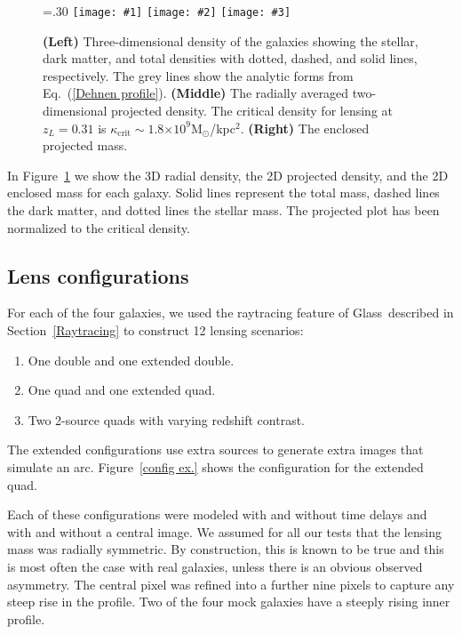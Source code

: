 \documentclass[galley]{mn2e}
\newcommand{\Glass}{{\sc Glass}}
\newcommand{\Msun}{\ensuremath{\mathrm{M}_\odot}}
\newcommand{\figref}[1] {Figure~\ref{#1}}
\newcommand{\eqnref}[1] {Eq.~(\ref{#1})}
\newcommand{\secref}[1] {Section~\ref{#1}}
\newcommand{\e}[1]{\ensuremath{\times 10^{#1}}}
\newcommand\plotone[1]{%
 \centering
 \leavevmode
 \texttt{[image: \#1]}%
}%
\newcommand\plotthree[3]{{%
 \centering
 \leavevmode
 \columnwidth=.30\columnwidth
 \texttt{[image: \#1]}%
 \hfil
 \texttt{[image: \#2]}%
 \hfil
 \texttt{[image: \#3]}%
}}%
\begin{document}
\begin{figure}
\plotthree{MockGalProfile-a.pdf} {MockGalProfile-b.pdf} {MockGalProfile-c.pdf}
\caption{
\textbf{(Left)} 
Three-dimensional density of the galaxies showing the stellar, dark matter,
and total densities with dotted, dashed, and solid lines, respectively. The
grey lines show the analytic forms from \eqnref{Dehnen profile}. 
\textbf{(Middle)} 
The radially averaged two-dimensional projected density.
The critical density for lensing at $z_L=0.31$ is $\kappa_\mathrm{crit}\sim 1.8\e{9}$\Msun/kpc$^2$.
\textbf{(Right)}
The enclosed projected mass.
}
\label{mock galaxies}
\end{figure}

In \figref{mock galaxies} we show the 3D radial density, 
the 2D projected density, and the 2D enclosed mass for each
galaxy. Solid lines represent the total mass, dashed lines the dark 
matter, and dotted lines the stellar mass. The projected plot has
been normalized to the critical density.

\subsection{Lens configurations} %

For each of the four galaxies, we used the raytracing feature of \Glass\
described in \secref{Raytracing} to construct 12 lensing scenarios:

\begin{enumerate}
\item One double and one extended double.
\item One quad and one extended quad.
\item Two 2-source quads with varying redshift contrast.
\end{enumerate}

The extended configurations use extra sources to generate extra images that
simulate an arc. \figref{config ex.} shows the configuration for the extended
quad.

Each of these configurations were modeled with and without time delays and with
and without a central image. We assumed for all our tests that the lensing mass
was radially symmetric. By construction, this is known to be true and this is
most often the case with real galaxies, unless there is an obvious observed
asymmetry. The central pixel was refined into a further nine pixels to capture
any steep rise in the profile. Two of the four mock galaxies have a steeply rising
inner profile.
\end{document}

